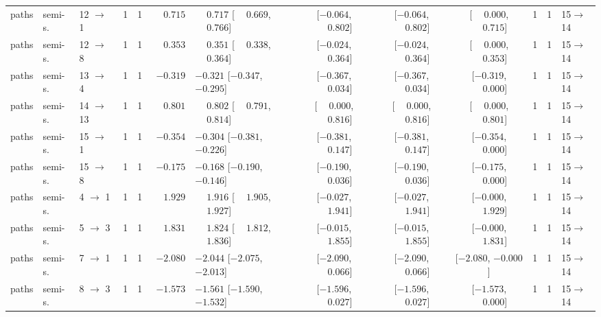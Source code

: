 \begin{landscape}
\begin{longtable}{@{}llp{2.15cm}ccrl cccc c l@{}}
paths & semi-s. & 12 $\to$ 1 & 1 & 1 & $\phantom{-}0.715$ & $\phantom{-}0.717$ [$\phantom{-}0.669$, $\phantom{-}0.766$] & [$-0.064$, $\phantom{-}0.802$] & [$-0.064$, $\phantom{-}0.802$] & [$\phantom{-}0.000$, $\phantom{-}0.715$] & 1 & 1 & 15$\to$14 \\
paths & semi-s. & 12 $\to$ 8 & 1 & 1 & $\phantom{-}0.353$ & $\phantom{-}0.351$ [$\phantom{-}0.338$, $\phantom{-}0.364$] & [$-0.024$, $\phantom{-}0.364$] & [$-0.024$, $\phantom{-}0.364$] & [$\phantom{-}0.000$, $\phantom{-}0.353$] & 1 & 1 & 15$\to$14 \\
paths & semi-s. & 13 $\to$ 4 & 1 & 1 & $-0.319$ & $-0.321$ [$-0.347$, $-0.295$] & [$-0.367$, $\phantom{-}0.034$] & [$-0.367$, $\phantom{-}0.034$] & [$-0.319$, $\phantom{-}0.000$] & 1 & 1 & 15$\to$14 \\
paths & semi-s. & 14 $\to$ 13 & 1 & 1 & $\phantom{-}0.801$ & $\phantom{-}0.802$ [$\phantom{-}0.791$, $\phantom{-}0.814$] & [$\phantom{-}0.000$, $\phantom{-}0.816$] & [$\phantom{-}0.000$, $\phantom{-}0.816$] & [$\phantom{-}0.000$, $\phantom{-}0.801$] & 1 & 1 & 15$\to$14 \\
paths & semi-s. & 15 $\to$ 1 & 1 & 1 & $-0.354$ & $-0.304$ [$-0.381$, $-0.226$] & [$-0.381$, $\phantom{-}0.147$] & [$-0.381$, $\phantom{-}0.147$] & [$-0.354$, $\phantom{-}0.000$] & 1 & 1 & 15$\to$14 \\
paths & semi-s. & 15 $\to$ 8 & 1 & 1 & $-0.175$ & $-0.168$ [$-0.190$, $-0.146$] & [$-0.190$, $\phantom{-}0.036$] & [$-0.190$, $\phantom{-}0.036$] & [$-0.175$, $\phantom{-}0.000$] & 1 & 1 & 15$\to$14 \\
paths & semi-s. & 4 $\to$ 1 & 1 & 1 & $\phantom{-}1.929$ & $\phantom{-}1.916$ [$\phantom{-}1.905$, $\phantom{-}1.927$] & [$-0.027$, $\phantom{-}1.941$] & [$-0.027$, $\phantom{-}1.941$] & [$-0.000$, $\phantom{-}1.929$] & 1 & 1 & 15$\to$14 \\
paths & semi-s. & 5 $\to$ 3 & 1 & 1 & $\phantom{-}1.831$ & $\phantom{-}1.824$ [$\phantom{-}1.812$, $\phantom{-}1.836$] & [$-0.015$, $\phantom{-}1.855$] & [$-0.015$, $\phantom{-}1.855$] & [$-0.000$, $\phantom{-}1.831$] & 1 & 1 & 15$\to$14 \\
paths & semi-s. & 7 $\to$ 1 & 1 & 1 & $-2.080$ & $-2.044$ [$-2.075$, $-2.013$] & [$-2.090$, $\phantom{-}0.066$] & [$-2.090$, $\phantom{-}0.066$] & [$-2.080$, $-0.000$] & 1 & 1 & 15$\to$14 \\
paths & semi-s. & 8 $\to$ 3 & 1 & 1 & $-1.573$ & $-1.561$ [$-1.590$, $-1.532$] & [$-1.596$, $\phantom{-}0.027$] & [$-1.596$, $\phantom{-}0.027$] & [$-1.573$, $\phantom{-}0.000$] & 1 & 1 & 15$\to$14 \\

\end{longtable}
\end{landscape}
